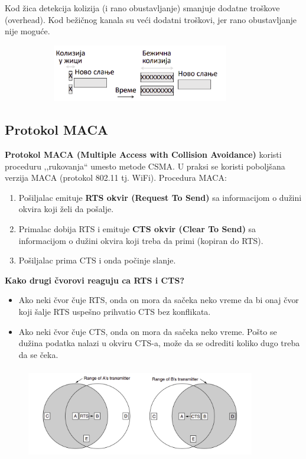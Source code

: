 \documentclass[a4paper]{article}
\begin{document}
    \indent Kod žica detekcija kolizija (i rano obustavljanje) smanjuje dodatne troškove (overhead).
    Kod bežičnog kanala su veći dodatni troškovi, jer rano obustavljanje nije moguće.  
    \begin{figure}[H]
        \begin{center}
            \includegraphics[width=100mm,height=25mm]{Slike/kolizija_zica_bez.png}
        \end{center}
    \end{figure}

    \subsection{Protokol MACA}
        \textbf{Protokol MACA (Multiple Access with Collision Avoidance)} koristi proceduru ,,rukovanja``
        umesto metode CSMA. U praksi se koristi poboljšana verzija MACA (protokol 802.11 tj. WiFi).
        Procedura MACA:
        \begin{enumerate}
            \item Pošiljalac emituje \textbf{RTS okvir (Request To Send)} sa informacijom o dužini okvira
                  koji želi da pošalje.  
            \item Primalac dobija RTS i emituje \textbf{CTS okvir (Clear To Send)} sa informacijom o dužini 
                  okvira koji treba da primi (kopiran do RTS).
            \item Pošiljalac prima CTS i onda počinje slanje.  
        \end{enumerate} 
        \textbf{Kako drugi čvorovi reaguju ca RTS i CTS?}
        \begin{itemize}
            \item Ako neki čvor čuje RTS, onda on mora da sačeka neko vreme da bi
                  onaj čvor koji šalje RTS uspešno prihvatio CTS bez konflikata.
            \item Ako neki čvor čuje CTS, onda on mora da sačeka neko vreme. 
                  Pošto se dužina podatka nalazi u okviru CTS-a, može da 
                  se odrediti koliko dugo treba da se čeka.
        \end{itemize}
        \begin{figure}[H]
            \begin{center}
                \includegraphics[width=100mm,height=40mm]{Slike/maca1.png}
            \end{center}
        \end{figure}
\end{document}
